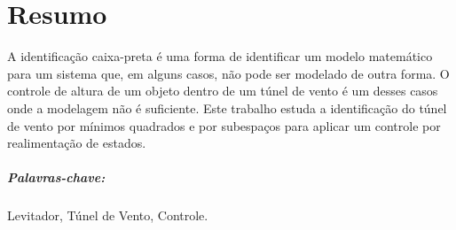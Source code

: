\chapter*{Resumo}
\thispagestyle{empty}

A identificação caixa-preta é uma forma de identificar um modelo matemático para um sistema que, em alguns casos, não pode ser modelado de outra forma. O controle de altura de um objeto dentro de um túnel de vento é um desses casos onde a modelagem não é suficiente. Este trabalho estuda a identificação do túnel de vento por mínimos quadrados e por subespaços para aplicar um controle por realimentação de estados.

\vspace{50pt}

\paragraph{Palavras-chave:} Levitador, Túnel de Vento, Controle.
